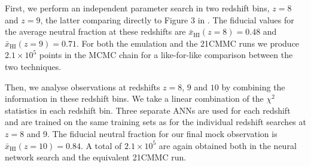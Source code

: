 \documentclass[useAMS,usenatbib]{mnras}
\begin{document}
First, we perform an independent parameter search in two redshift bins, $z = 8$ and $z = 9$, the latter comparing directly to Figure 3 in \citet{greig2015}. 
The fiducial values for the average neutral fraction at these redshifts are $\bar{x}_\text{HI}(z = 8) = 0.48$ and $\bar{x}_\text{HI}(z = 9) = 0.71$.
For both the emulation and the 21CMMC runs we produce $2.1\times 10^5$ points in the MCMC chain for a like-for-like comparison between the two techniques.
 
Then, we analyse observations at redshifts $z = 8$,  $9$ and $10$ by combining the information in these redshift bins.
We take a linear combination of the $\chi^2$ statistics in each redshift bin.
Three separate ANNs are used for each redshift and are trained on the same training sets as for the individual redshift searches at $z = 8$ and 9.
The fiducial neutral fraction for our final mock observation is $\bar{x}_\text{HI}(z = 10) = 0.84$. 
A total of $2.1\times 10^5$ are again obtained both in the neural network search and the equivalent 21CMMC run. 








\end{document}
